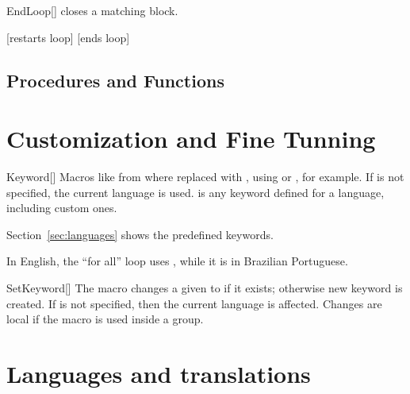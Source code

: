 \documentclass[a4paper, 11pt]{article}
\begin{document}
\begin{macro}{EndLoop}[]
     closes a matching  block.

    \StatementOptions
\end{macro}

\begin{tcblisting}{}
    \begin{algorithmic}
        \Loop
                \Statep{\Continue}[restarts loop]
            \EndIf
                \Statep{\Break}[ends loop]
            \EndIf
        \EndLoop
    \end{algorithmic}
\end{tcblisting}

\subsection{Procedures and Functions}


\section{Customization and Fine Tunning}

\begin{macro}{Keyword}[]
    Macros like  from  where replaced with , using  or , for example.
    If  is not specified, the current language is used.  is any keyword defined for a language, including custom ones.

    Section~\ref{sec:languages} shows the predefined keywords.

    \begin{tcblisting}{}
        In English, the ``for all'' loop uses , while it is  in Brazilian Portuguese.
    \end{tcblisting}
\end{macro}

\begin{macro}{SetKeyword}[]
    The macro  changes a given  to  if it exists; otherwise new keyword is created.
    If  is not specified, then the current language is affected. Changes are local if the macro is used inside a group.
\end{macro}


\section{Languages and translations}






\clearpage
\printindex
\end{document}
